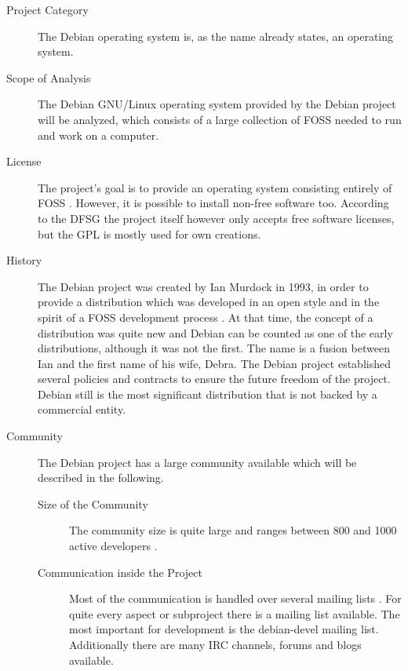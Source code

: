 \begin{description}

  \item[Project Category] The Debian operating system is, as the name already
    states, an operating system.

  \item[Scope of Analysis] The Debian \ac{GNU}/Linux operating system provided
    by the Debian project will be analyzed, which consists of a large
    collection of \ac{FOSS} needed to run and work on a computer.

  \item[License] The project's goal is to provide an operating system
    consisting entirely of \ac{FOSS} \cite{DebianLicense,DebianFAQ}. However,
    it is possible to install non-free software too. According to the \ac{DFSG}
    the project itself however only accepts free software licenses, but the
    \ac{GPL} is mostly used for own creations.

  \item[History] The Debian project was created by Ian Murdock in 1993, in
    order to provide a distribution which was developed in an open style and in
    the spirit of a \ac{FOSS} development process
    \cite{DebianAbout,DebianHistory,Sadowski2008}. At that time, the concept of
    a distribution was quite new and Debian can be counted as one of the early
    distributions, although it was not the first. The name is a fusion between
    Ian and the first name of his wife, Debra. The Debian project established
    several policies and contracts to ensure the future freedom of the project.
    Debian still is the most significant distribution that is not backed by a
    commercial entity.

  \item[Community] The Debian project has a large community available which
    will be described in the following.

  \begin{description}

    \item[Size of the Community] The community size is quite large and ranges
      between 800 and 1000 active developers \cite{Perrier2011,DebianOrg}.

    \item[Communication inside the Project] Most of the communication is
      handled over several mailing lists
      \cite{DebianMailingLists,DebianFAQ,DebianNewMembers}. For quite every
      aspect or subproject there is a mailing list available. The most
      important for development is the debian-devel mailing list. Additionally
      there are many \ac{IRC} channels, forums and blogs available.


\end{description}
\end{description}
